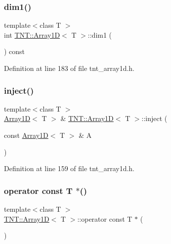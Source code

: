 \subsubsection{\texorpdfstring{dim1()}{dim1()}}
{\footnotesize\ttfamily template$<$class T $>$ \\
int \hyperlink{classTNT_1_1Array1D}{T\+N\+T\+::\+Array1D}$<$ T $>$\+::dim1 (\begin{DoxyParamCaption}{ }\end{DoxyParamCaption}) const\hspace{0.3cm}{\ttfamily [inline]}}



Definition at line 183 of file tnt\+\_\+array1d.\+h.

\mbox{\label{classTNT_1_1Array1D_a214990ddf4bcb1541bcd18cbfdeb0b25}} 
\subsubsection{\texorpdfstring{inject()}{inject()}}
{\footnotesize\ttfamily template$<$class T $>$ \\
\hyperlink{classTNT_1_1Array1D}{Array1D}$<$ T $>$ \& \hyperlink{classTNT_1_1Array1D}{T\+N\+T\+::\+Array1D}$<$ T $>$\+::inject (\begin{DoxyParamCaption}\item[{const \hyperlink{classTNT_1_1Array1D}{Array1D}$<$ T $>$ \&}]{A }\end{DoxyParamCaption})}



Definition at line 159 of file tnt\+\_\+array1d.\+h.

\mbox{\label{classTNT_1_1Array1D_a6092726d1cea6451128467064a2c31cb}} 
\subsubsection{\texorpdfstring{operator const T $\ast$()}{operator const T *()}}
{\footnotesize\ttfamily template$<$class T $>$ \\
\hyperlink{classTNT_1_1Array1D}{T\+N\+T\+::\+Array1D}$<$ T $>$\+::operator const T $\ast$ (\begin{DoxyParamCaption}{ }\end{DoxyParamCaption})\hspace{0.3cm}{\ttfamily [inline]}}



